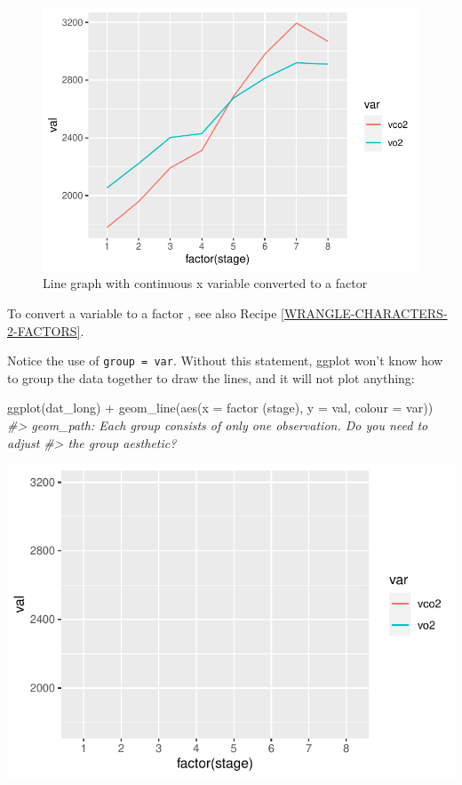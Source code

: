 \documentclass[
]{book}
\newenvironment{Shaded}{\begin{snugshade}}{\end{snugshade}}
\newcommand{\AttributeTok}[1]{\textcolor[rgb]{0.77,0.63,0.00}{#1}}
\newcommand{\CommentTok}[1]{\textcolor[rgb]{0.56,0.35,0.01}{\textit{#1}}}
\newcommand{\FunctionTok}[1]{\textcolor[rgb]{0.00,0.00,0.00}{#1}}
\newcommand{\NormalTok}[1]{#1}
\newcommand{\SpecialCharTok}[1]{\textcolor[rgb]{0.00,0.00,0.00}{#1}}
\begin{document}
\begin{figure}

{\centering \includegraphics[width=0.5\linewidth]{se201_stats_book_files/figure-latex/FIG-LINE-GRAPH-MULTI-LINE-FACTOR-1} 

}

\caption[Line graph with continuous x variable converted to a factor]{Line graph with continuous x variable converted to a factor}\label{fig:FIG-LINE-GRAPH-MULTI-LINE-FACTOR}
\end{figure}

To convert a variable to a factor , see also Recipe \ref{WRANGLE-CHARACTERS-2-FACTORS}.

Notice the use of \texttt{group\ =\ var}. Without this statement, ggplot won't know how to group the data together to draw the lines, and it will not plot anything:

\begin{Shaded}
\begin{Highlighting}[]

\FunctionTok{ggplot}\NormalTok{(dat\_long) }\SpecialCharTok{+}
  \FunctionTok{geom\_line}\NormalTok{(}\FunctionTok{aes}\NormalTok{(}\AttributeTok{x =} \FunctionTok{factor}\NormalTok{ (stage), }\AttributeTok{y =}\NormalTok{ val, }\AttributeTok{colour =}\NormalTok{ var))}
\CommentTok{\#\textgreater{} geom\_path: Each group consists of only one observation. Do you need to adjust}
\CommentTok{\#\textgreater{} the group aesthetic?}
\end{Highlighting}
\end{Shaded}

\begin{center}\includegraphics[width=0.5\linewidth]{se201_stats_book_files/figure-latex/unnamed-chunk-138-1} \end{center}
\end{document}

